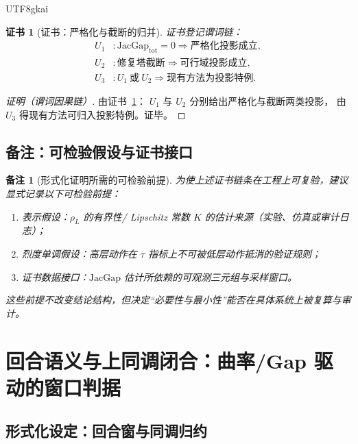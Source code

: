 \documentclass[12pt]{article}
\newtheorem{remark}{备注}[section]
\newtheorem{Certificate}{证书}[section]
\newcommand{\JacGap}{\ensuremath{\mathrm{JacGap}}} %
\begin{document}
\begin{CJK*}{UTF8}{gkai}
\begin{Certificate}[证书：严格化与截断的归并]
\label{cert:existing-methods-projection}
证书登记谓词链：
\[
\begin{aligned}
  U_1 &: \JacGap_{\mathrm{tot}}=0\Rightarrow \text{严格化投影成立},\\
  U_2 &: \text{修复塔截断}\Rightarrow \text{可行域投影成立},\\
  U_3 &: U_1\ \text{或}\ U_2\Rightarrow \text{现有方法为投影特例}.
\end{aligned}
\]
\end{Certificate}

\begin{proof}[证明（谓词因果链）]
由证书~\ref{cert:existing-methods-projection}：
$U_1$ 与 $U_2$ 分别给出严格化与截断两类投影，
由 $U_3$ 得现有方法可归入投影特例。证毕。
\end{proof}

\subsection{备注：可检验假设与证书接口}
\label{sec:open-system-remarks}

\begin{remark}[形式化证明所需的可检验前提]
为使上述证书链条在工程上可复验，建议显式记录以下可检验前提：
\begin{enumerate}
  \item 表示假设：$\rho_L$ 的有界性/ Lipschitz 常数 $K$ 的估计来源（实验、仿真或审计日志）；
  \item 烈度单调假设：高层动作在 $\tau$ 指标上不可被低层动作抵消的验证规则；
  \item 证书数据接口：$\JacGap$ 估计所依赖的可观测三元组与采样窗口。
\end{enumerate}
这些前提不改变结论结构，但决定“必要性与最小性”能否在具体系统上被复算与审计。
\end{remark}

\section{回合语义与上同调闭合：曲率/Gap 驱动的窗口判据}
\label{sec:round-cohomology-window}

\subsection{形式化设定：回合窗与同调归约}
\label{sec:round-window-formalization}


\end{CJK*}
\end{document}

